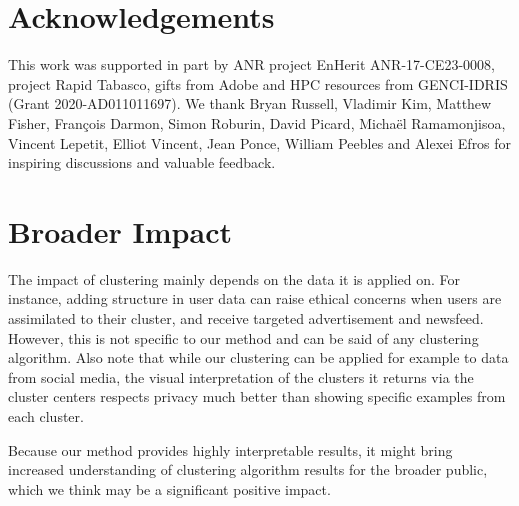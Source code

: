 \documentclass{article}
\begin{document}
\section*{Acknowledgements}
\vspace{-0.7em}
This work was supported in part by ANR project EnHerit ANR-17-CE23-0008, project Rapid 
Tabasco, gifts  from  Adobe and HPC resources from GENCI-IDRIS (Grant 2020-AD011011697). We 
thank Bryan Russell, Vladimir Kim, Matthew Fisher, François Darmon, Simon Roburin, David 
Picard, Michaël Ramamonjisoa, Vincent Lepetit, Elliot Vincent, Jean Ponce, William Peebles 
and Alexei Efros for inspiring discussions and valuable feedback.

\newpage
\section*{Broader Impact}

The impact of clustering mainly depends on the data it is applied on. For instance, adding 
structure in user data can raise ethical concerns when users are assimilated to their 
cluster, and receive targeted advertisement and newsfeed. However, this is not specific to 
our method and can be said of any clustering algorithm. Also note that while our clustering  
can be applied for example to data from social media, the visual interpretation of the 
clusters it returns via the cluster centers respects privacy much better than showing 
specific examples from each cluster.

Because our method provides highly interpretable results, it might bring increased 
understanding of clustering algorithm results for the broader public, which we think may be a 
significant positive impact.

\small


\newpage
\normalsize
\appendix
\end{document}
